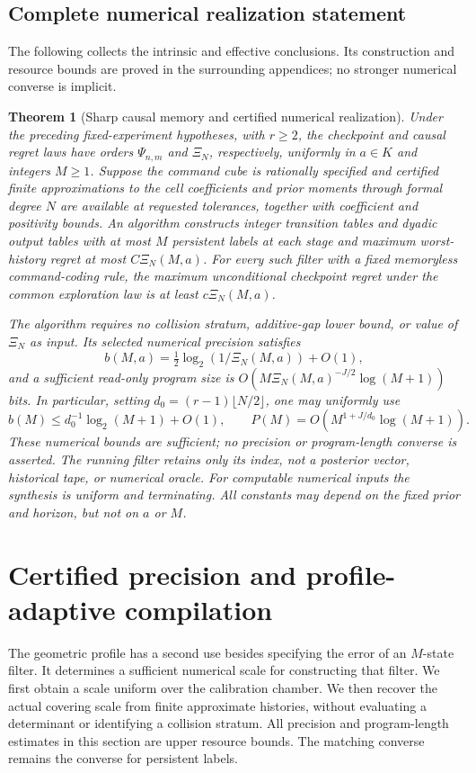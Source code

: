 \documentclass[11pt]{amsart}
\newtheorem{theorem}{Theorem}[section]
\theoremstyle{definition}\newtheorem{definition}[theorem]{Definition}
\theoremstyle{remark}\newtheorem{remark}[theorem]{Remark}
\begin{document}
\subsection{Complete numerical realization statement}
The following collects the intrinsic and effective conclusions. Its construction and resource bounds are proved in the surrounding appendices; no stronger numerical converse is implicit.
\begin{theorem}[Sharp causal memory and certified numerical realization]
\label{thm:effective-main}
Under the preceding fixed-experiment hypotheses, with $r\ge2$, the
checkpoint and causal regret laws have orders $\Psi_{n,m}$ and $\Xi_N$,
respectively, uniformly in $a\in K$ and integers $M\ge1$.
Suppose the command cube is rationally specified and certified finite
approximations to the cell coefficients and prior moments through formal
degree $N$ are available at requested tolerances, together with coefficient and
positivity bounds.
An algorithm constructs integer transition tables and dyadic output
tables with at most $M$ persistent labels at each stage and maximum
worst-history regret at most $C\Xi_N(M,a)$. For every such filter with
a fixed memoryless command-coding rule, the maximum unconditional
checkpoint regret under the common exploration law is at least
$c\Xi_N(M,a)$.

The algorithm requires no collision stratum, additive-gap lower bound,
or value of $\Xi_N$ as input. Its selected numerical precision satisfies
\[
 b(M,a)=\tfrac12\log_2(1/\Xi_N(M,a))+O(1),
\]
and a sufficient read-only program size is
$O(M\Xi_N(M,a)^{-J/2}\log(M+1))$ bits. In particular, setting
$d_0=(r-1)\lfloor N/2\rfloor$, one may uniformly use
\[
 b(M)\le d_0^{-1}\log_2(M+1)+O(1),\qquad
 P(M)=O(M^{1+J/d_0}\log(M+1)).
\]
These numerical bounds are sufficient; no precision or program-length
converse is asserted. The running filter retains only its index, not a
posterior vector, historical tape, or numerical oracle. For computable
numerical inputs the synthesis is uniform and terminating. All constants
may depend on the fixed prior and horizon, but not on $a$ or $M$.
\end{theorem}

\section{Certified precision and profile-adaptive compilation}
\label{sec:certified-resources}
The geometric profile has a second use besides specifying the error of
an $M$-state filter. It determines a sufficient numerical scale for
constructing that filter. We first obtain a scale uniform over the
calibration chamber. We then recover the actual covering scale from
finite approximate histories, without evaluating a determinant or
identifying a collision stratum. All precision and program-length
estimates in this section are upper resource bounds. The matching
converse remains the converse for persistent labels.
\end{document}
